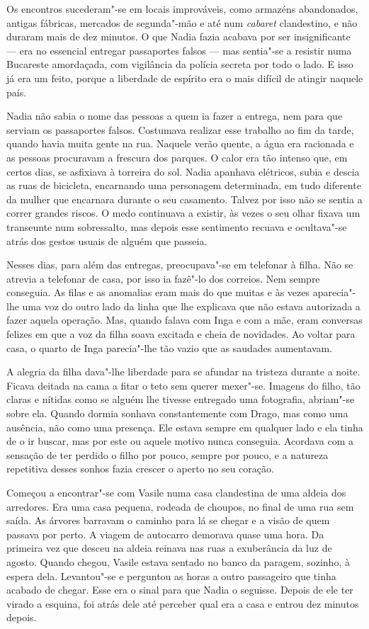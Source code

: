 Os encontros sucederam"-se em locais improváveis,
como armazéns abandonados, antigas fábricas, mercados de segunda"-mão e
até num \emph{cabaret} clandestino, e não duraram mais de dez minutos. O
que Nadia fazia acabava por ser insignificante --- era no essencial
entregar passaportes falsos --- mas sentia"-se a resistir numa Bucareste
amordaçada, com vigilância da polícia secreta por todo o lado.
E isso já era um feito, porque a liberdade de espírito era o mais
difícil de atingir naquele país.

Nadia não sabia o nome das pessoas a quem ia fazer a entrega, nem para
que serviam os passaportes falsos. Costumava realizar esse trabalho ao
fim da tarde, quando havia muita gente na rua. Naquele verão quente, a
água era racionada e as pessoas procuravam a frescura dos parques. O
calor era tão intenso que, em certos dias, se asfixiava à torreira do
sol. Nadia apanhava elétricos, subia e descia as ruas de bicicleta,
encarnando uma personagem determinada, em tudo diferente da mulher que
encarnara durante o seu casamento. Talvez por isso não se sentia a
correr grandes riscos. O medo continuava a existir, às vezes o seu olhar
fixava um transeunte num sobressalto, mas depois esse sentimento recuava
e ocultava"-se atrás dos gestos usuais de alguém que passeia.

Nesses dias, para além das entregas, preocupava"-se em
telefonar à filha. Não se atrevia a telefonar de casa, por isso ia
fazê"-lo dos correios. Nem sempre conseguia. As filas e as anomalias eram
mais do que muitas e às vezes aparecia"-lhe uma voz do outro lado da
linha que lhe explicava que não estava autorizada a fazer aquela
operação. Mas, quando falava com Inga e com a mãe, eram conversas
felizes em que a voz da filha soava excitada e cheia de novidades. Ao
voltar para casa, o quarto de Inga parecia"-lhe tão vazio que as saudades aumentavam.

A alegria da filha dava"-lhe liberdade para se afundar na tristeza
durante a noite. Ficava deitada na cama a fitar o teto sem querer
mexer"-se. Imagens do filho, tão claras e nítidas como se alguém lhe
tivesse entregado uma fotografia, abriam"-se sobre ela. Quando dormia sonhava constantemente com
Drago, mas como uma ausência, não como uma presença. Ele estava sempre
em qualquer lado e ela tinha de o ir buscar, mas por este ou aquele
motivo nunca conseguia. Acordava com a sensação de ter perdido o filho
por pouco, sempre por pouco, e a natureza repetitiva desses sonhos
fazia crescer o aperto no seu coração.

Começou a encontrar"-se com Vasile numa casa clandestina de uma aldeia
dos arredores. Era uma casa pequena, rodeada de choupos, no final de uma
rua sem saída. As árvores barravam o caminho para lá se chegar e a visão
de quem passava por perto. A viagem de autocarro demorava quase uma
hora. Da primeira vez que desceu na aldeia reinava nas ruas a
exuberância da luz de agosto. Quando chegou, Vasile estava sentado no
banco da paragem, sozinho, à espera dela. Levantou"-se e perguntou as
horas a outro passageiro que tinha acabado de chegar. Esse era o sinal
para que Nadia o seguisse. Depois de ele ter virado a esquina, foi atrás
dele até perceber qual era a casa e entrou dez minutos depois.

